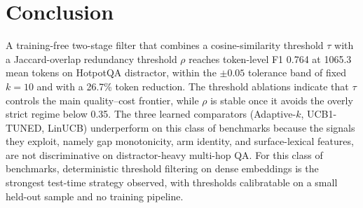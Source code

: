 \documentclass[runningheads]{llncs}
\begin{document}


\section{Conclusion}
\label{sec:conclusion}

A training-free two-stage filter that combines a cosine-similarity threshold $\tau$ with a Jaccard-overlap redundancy threshold $\rho$ reaches token-level F1 0.764 at 1065.3 mean tokens on HotpotQA distractor, within the $\pm 0.05$ tolerance band of fixed $k{=}10$ and with a 26.7\% token reduction. The threshold ablations indicate that $\tau$ controls the main quality--cost frontier, while $\rho$ is stable once it avoids the overly strict regime below 0.35. The three learned comparators (Adaptive-$k$, UCB1-TUNED, LinUCB) underperform on this class of benchmarks because the signals they exploit, namely gap monotonicity, arm identity, and surface-lexical features, are not discriminative on distractor-heavy multi-hop QA. For this class of benchmarks, deterministic threshold filtering on dense embeddings is the strongest test-time strategy observed, with thresholds calibratable on a small held-out sample and no training pipeline.
\end{document}
